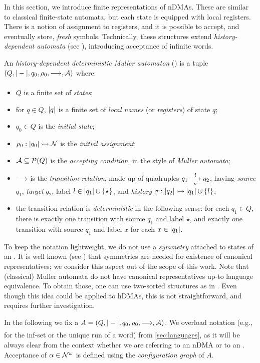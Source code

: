 
In this section, we introduce finite representations of nDMAs. These are similar to classical finite-state automata, but each state is equipped with local registers. There is a notion of assignment to registers, and it is possible to accept, and eventually store, \emph{fresh} symbols. Technically, these structures extend \emph{history-dependent automata} (see \cite{Pistore99}), introducing acceptance of infinite words.

\begin{definition}\label{def:hdma}
 An \emph{history-dependent deterministic Muller automaton} (\hdma) is a tuple $(Q,|-|,q_0,\rho_0,\overset{}{\underset{}{\longrightarrow}},\mathcal{A})$
 where:
 \begin{itemize}
  \item $Q$ is a finite set of \emph{states};
  \item for $q \in Q$, $|q|$ is a finite set of \emph{local names} (or \emph{registers}) of state $q$;
  \item $q_0 \in Q$ is the \emph{initial state};
  \item $\rho_0 : |q_0| \rightarrowtail \mathcal{N}$ is the \emph{initial assignment};
  \item $\mathcal{A} \subseteq \mathcal{P}(Q)$ is the \emph{accepting condition}, in the style of \emph{Muller automata};
  \item $\overset{}{\underset{}{\longrightarrow}}$ is the \emph{transition relation}, made up of quadruples $q_1 \overset{l}{\underset{\sigma}{\longrightarrow}} q_2$, having \emph{source} $q_1$, \emph{target} $q_2$, label $l \in |q_1| \uplus \{\star\}$, and \emph{history} $\sigma : |q_2| \rightarrowtail |q_1| \uplus \{l\}$;
  \item the transition relation is \emph{deterministic} in the following sense: for each $q_1 \in Q$,   there is exactly one transition with source $q_1$ and label $\star$, and exactly one transition with source $q_1$ and label $x$ for each $x \in |q_1|$.
 \end{itemize}
\end{definition}
%

\begin{remark}
To keep the notation lightweight, we do not use a \emph{symmetry} attached to states of an \hdma. It is well known (see \cite{MontanariP05}) that symmetries are needed for existence of canonical representatives; we consider this aspect out of the scope of this work. Note that (classical) Muller automata do not have canonical representatives up-to language equivalence. To obtain those, one can use two-sorted structures as in \cite{CV12}. Even though this idea could be applied to hDMAs, this is not straightforward, and requires further investigation.
\label{rem:no-symmetry}
\end{remark}
%
In the following we fix a \hdma{} $A = (Q,|-|,q_0,\rho_0,\overset{}{\underset{}{\longrightarrow}},\mathcal{A})$. We overload notation (e.g., for the inf-set or the unique run of a word) from \cref{sec:languages}, as it will be always clear from the context whether we are referring to an nDMA or to an \hdma. Acceptance of $\alpha \in \mathcal{N}^\omega$ is defined using the \emph{configuration graph} of $A$.


